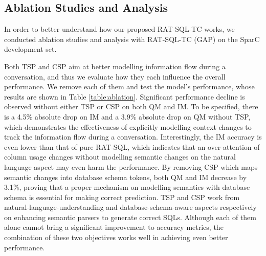 \documentclass[a4paper]{article}
\begin{document}
\subsection{Ablation Studies and Analysis}

In order to better understand how our proposed RAT-SQL-TC works, we conducted ablation studies and analysis with RAT-SQL-TC (GAP) on the SparC development set.

Both TSP and CSP aim at better modelling information flow during a conversation, and thus we evaluate how they each influence the overall performance. We remove each of them and test the model's performance, whose results are shown in Table \ref{table:ablation}. Significant performance decline is observed without either TSP or CSP on both QM and IM. To be specified, there is a 4.5\% absolute drop on IM and a 3.9\% absolute drop on QM without TSP, which demonstrates the effectiveness of explicitly modelling context changes to track the information flow during a conversation. Interestingly, the IM accuracy is even lower than that of pure RAT-SQL, which indicates that an over-attention of column usage changes without modelling semantic changes on the natural language aspect may even harm the performance. By removing CSP which maps semantic changes into database schema tokens, both QM and IM decrease by 3.1\%, proving that a proper mechanism on modelling semantics with database schema is essential for making correct prediction. TSP and CSP work from natural-language-understanding and database-schema-aware aspects respectively on enhancing semantic parsers to generate correct SQLs. Although each of them alone cannot bring a significant improvement to accuracy metrics, the combination of these two objectives works well in achieving even better performance.
\begin{table}[htbp]
\centering
{}
\caption{Model performance by ablating TSP and CSP.}
\label{table:ablation}\vspace{-3mm}
\end{table}
\end{document}
